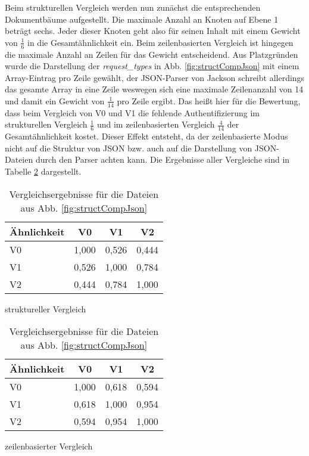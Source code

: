 Beim strukturellen Vergleich werden nun zunächst die entsprechenden Dokumentbäume aufgestellt. Die maximale Anzahl an Knoten auf Ebene 1 beträgt sechs. Jeder dieser Knoten geht also für seinen Inhalt mit einem Gewicht von $\frac{1}{6}$ in die Gesamtähnlichkeit ein. Beim zeilenbasierten Vergleich ist hingegen die maximale Anzahl an Zeilen für das Gewicht entscheidend. Aus Platzgründen wurde die Darstellung der \emph{request\_types} in Abb. \ref{fig:structCompJson} mit einem Array-Eintrag pro Zeile gewählt, der JSON-Parser von Jackson schreibt allerdings das gesamte Array in eine Zeile weswegen sich eine maximale Zeilenanzahl von 14 und damit ein Gewicht von $\frac{1}{14}$ pro Zeile ergibt. Das heißt hier für die Bewertung, dass beim Vergleich von V0 und V1 die fehlende Authentifizierung im strukturellen Vergleich $\frac{1}{6}$ und im zeilenbasierten Vergleich $\frac{4}{14}$ der Gesamtähnlichkeit kostet. Dieser Effekt entsteht, da der zeilenbasierte Modus nicht auf die Struktur von JSON bzw. auch auf die Darstellung von JSON-Dateien durch den Parser achten kann. Die Ergebnisse aller Vergleiche sind in Tabelle \ref{table:vergleichsmodi} dargestellt. 

\begin{table}[!htb]
    \setlength{\tabcolsep}{8pt}
    \begin{subtable}{.5\linewidth}
      \centering
        \begin{tabular}{|l|c|c|c|}
        \hline
        Ähnlichkeit            & V0 & V1 & V2 \\ \hline
        V0 & 1,000  & 0,526  & 0,444  \\ \hline
        V1  & 0,526  & 1,000  & 0,784  \\ \hline
        V2 & 0,444  & 0,784  & 1,000  \\ \hline
        \end{tabular}
        \caption{struktureller Vergleich}
    \end{subtable}%
    \begin{subtable}{.5\linewidth}
      \centering
        \begin{tabular}{|l|c|c|c|}
        \hline
        Ähnlichkeit            & V0 & V1 & V2 \\ \hline
        V0 & 1,000  & 0,618  & 0,594  \\ \hline
        V1  & 0,618  & 1,000  & 0,954  \\ \hline
        V2 & 0,594  & 0,954  & 1,000  \\ \hline
        \end{tabular}
        \caption{zeilenbasierter Vergleich}
    \end{subtable} 
    \caption{Vergleichsergebnisse für die Dateien aus Abb. \ref{fig:structCompJson}}
    \label{table:vergleichsmodi}
\end{table}

